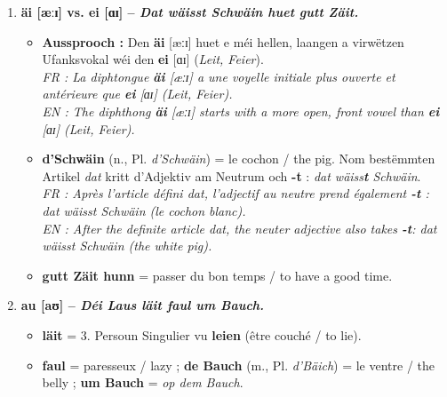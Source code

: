 \begin{enumerate}
    \item \textbf{äi {[æːɪ]} vs. ei {[ɑɪ]} -- \textit{Dat wäisst Schwäin huet gutt Zäit.}}
    \begin{itemize}
        \item \textbf{Aussprooch :} Den \textbf{äi} {[æːɪ]} huet e méi hellen, laangen a virwëtzen Ufanksvokal wéi den \textbf{ei} {[ɑɪ]} (\textit{Leit, Feier}). \\
        \textit{FR : La diphtongue \textbf{äi} {[æːɪ]} a une voyelle initiale plus ouverte et antérieure que \textbf{ei} {[ɑɪ]} (\textit{Leit, Feier}).} \\
        \textit{EN : The diphthong \textbf{äi} {[æːɪ]} starts with a more open, front vowel than \textbf{ei} {[ɑɪ]} (\textit{Leit, Feier}).}
        \item \textbf{d'Schwäin} (n., Pl. \textit{d'Schwäin}) = le cochon / the pig. Nom bestëmmten Artikel \textit{dat} kritt d'Adjektiv am Neutrum och \textbf{-t} : \textit{dat wäiss\textbf{t} Schwäin}. \\
        \textit{FR : Après l'article défini \textit{dat}, l'adjectif au neutre prend également \textbf{-t} : \textit{dat wäisst Schwäin} (le cochon blanc).} \\
        \textit{EN : After the definite article \textit{dat}, the neuter adjective also takes \textbf{-t}: \textit{dat wäisst Schwäin} (the white pig).}
        \item \textbf{gutt Zäit hunn} = passer du bon temps / to have a good time.
    \end{itemize}

    \vspace{0.3em}

    \item \textbf{au {[aʊ]} -- \textit{Déi Laus läit faul um Bauch.}}
    \begin{itemize}
        \item \textbf{läit} = 3. Persoun Singulier vu \textbf{leien} (être couché / to lie).
        \item \textbf{faul} = paresseux / lazy ; \textbf{de Bauch} (m., Pl. \textit{d'Bäich}) = le ventre / the belly ; \textbf{um Bauch} = \textit{op dem Bauch}.
    \end{itemize}
\end{enumerate}

\vspace{1.5em}

